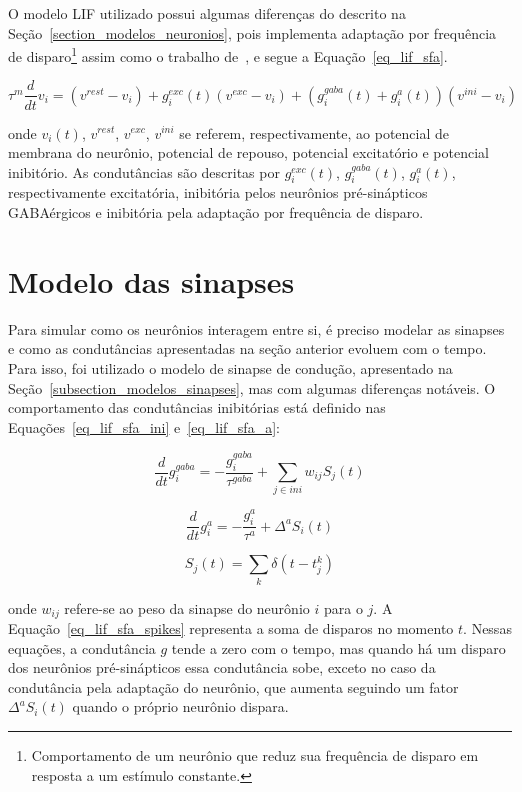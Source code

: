 O modelo LIF utilizado possui algumas diferenças do descrito na Seção~\ref{section_modelos_neuronios}, pois implementa adaptação
por frequência de disparo\footnote{Comportamento de um neurônio que reduz sua frequência de disparo em resposta a um estímulo
constante.} assim como o trabalho de~\cite{zenkeDiverse2015}, e segue a Equação~\ref{eq_lif_sfa}.

\begin{equation}
\label{eq_lif_sfa}
\tau^m\frac{d}{dt}v_i = (v^{rest} - v_i) + g_i^{exc}(t)(v^{exc} - v_i)+ (g_i^{gaba}(t) + g_i^{a}(t))(v^{ini} - v_i)
\end{equation}

\noindent{}onde $v_i(t)$, $v^{rest}$, $v^{exc}$, $v^{ini}$ se referem, respectivamente, ao potencial de membrana do neurônio,
potencial de repouso, potencial excitatório e potencial inibitório. As condutâncias são descritas por $g_i^{exc}(t)$,
$g_i^{gaba}(t)$, $g_i^{a}(t)$, respectivamente excitatória, inibitória pelos neurônios pré-sinápticos GABAérgicos e inibitória
pela adaptação por frequência de disparo.

\section{Modelo das sinapses}

Para simular como os neurônios interagem entre si, é preciso modelar as sinapses e como as condutâncias apresentadas na seção
anterior evoluem com o tempo. Para isso, foi utilizado o modelo de sinapse de
condução, apresentado na Seção~\ref{subsection_modelos_sinapses}, mas com algumas diferenças notáveis. O comportamento das
condutâncias inibitórias está definido nas Equações~\ref{eq_lif_sfa_ini} e~\ref{eq_lif_sfa_a}:

\begin{equation}
\label{eq_lif_sfa_ini}
\frac{d}{dt}g_i^{gaba} = -\frac{g_i^{gaba}}{\tau^{gaba}} + \sum_{j\in ini}{w_{ij}S_j(t)}
\end{equation}

\begin{equation}
\label{eq_lif_sfa_a}
\frac{d}{dt}g_i^{a} = -\frac{g_i^{a}}{\tau^{a}} + \Delta^{a}S_i(t)
\end{equation}

\begin{equation}
\label{eq_lif_sfa_spikes}
S_j(t) = \sum_{k}{\delta(t-t_j^k)}
\end{equation}

\noindent{}onde $w_{ij}$ refere-se ao peso da sinapse do neurônio $i$ para o $j$. A Equação~\ref{eq_lif_sfa_spikes} representa a
soma de disparos no momento $t$. Nessas equações, a condutância $g$ tende a zero com o tempo, mas quando há um disparo dos
neurônios pré-sinápticos essa condutância sobe, exceto no caso da condutância pela adaptação do neurônio, que aumenta seguindo um
fator $\Delta^{a}S_i(t)$ quando o próprio neurônio dispara.

